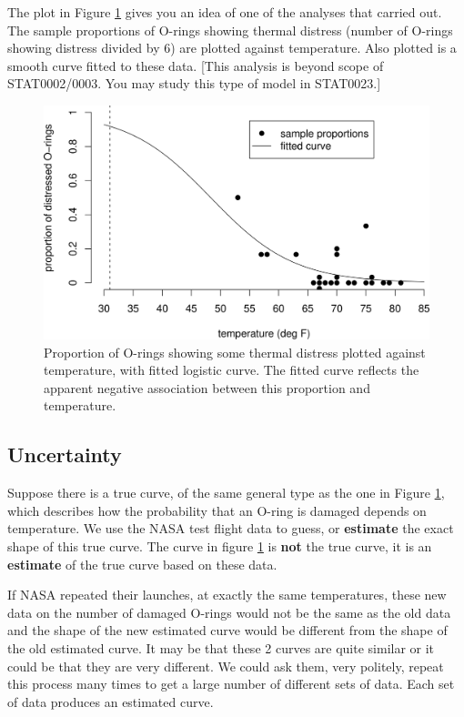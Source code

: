 \documentclass[
  11pt,
  british,
  openany, a4paper]{book}
\begin{document}
The plot in Figure \ref{fig:shuttle3} gives you an idea of one of the analyses that \citet{shuttle} carried out. The sample proportions
of O-rings showing thermal distress (number of O-rings showing distress divided by 6) are plotted against temperature. Also plotted is a smooth curve fitted to these data. {[}This analysis is beyond scope of STAT0002/0003. You may study this type of model in STAT0023.{]}

\begin{figure}

{\centering \includegraphics[width=0.75\linewidth]{images/shuttle3} 

}

\caption{Proportion of O-rings showing some thermal distress plotted against temperature, with fitted logistic curve.  The fitted curve reflects the apparent negative association between this proportion and temperature.}\label{fig:shuttle3}
\end{figure}

\hypertarget{uncertainty}{%
\subsection{Uncertainty}\label{uncertainty}}

Suppose there is a true curve, of the same general type as the one in Figure \ref{fig:shuttle3}, which describes how the probability that an O-ring is damaged depends on temperature. We use the NASA test flight data to guess, or \textbf{estimate} the exact shape of this true curve. The curve in figure \ref{fig:shuttle3} is \textbf{not} the true curve, it is an \textbf{estimate} of the true curve based on these data.

If NASA repeated their launches, at exactly the same temperatures, these new data on the number of damaged O-rings would not be the same as the old data and the shape of the new estimated curve would be different from the shape of the old estimated curve. It may be that these 2 curves are quite similar or it could be that they are very different. We could ask them, very politely, repeat this process many times to get a large number of different sets of data. Each set of data produces an estimated curve.
\end{document}
